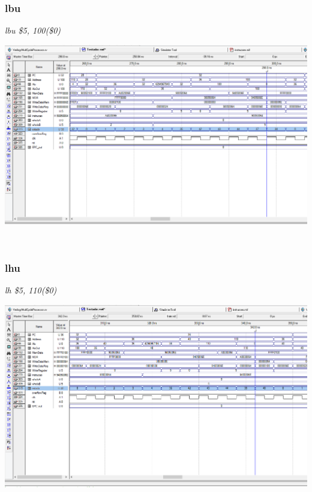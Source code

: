\documentclass{article}
\begin{document}
    \subsubsection{lbu}
    {\it lbu \$5, 100(\$0)}
    \begin{center}
        \includegraphics[scale=0.25]{lb.PNG}
    \end{center}
    
    \\
    \newpage
    \subsubsection{lhu}
    {\it lh \$5, 110(\$0)}
    \begin{center}
        \includegraphics[scale=0.25]{lh.PNG}
    \end{center}
    
    \\
\end{document}
